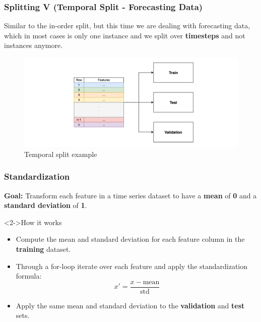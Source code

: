 \documentclass[t,english]{beamer}
\begin{document}
\begin{frame}
  \frametitle{Splitting V (Temporal Split - Forecasting Data)}
  Similar to the in-order split, but this time we are dealing with forecasting data, which in most cases is only one instance and we split over \textbf{timesteps} and not instances anymore.

  \begin{figure}[H]
    \includegraphics[width=1\textwidth]{figures/splitting/temporal_split.png}
    \caption{Temporal split example}
    \label{fig:temporal_split}
  \end{figure}
\end{frame}

\begin{frame}
  \frametitle{Standardization}
  \textbf{Goal:} Transform each feature in a time series dataset to have a \textbf{mean} of \textbf{0} and a \textbf{standard deviation} of \textbf{1}.

  \begin{block}<2->{How it works}
    \begin{itemize}
      \item<2-> Compute the mean and standard deviation for each feature column in the \textbf{training} dataset.
      \item<3-> Through a for-loop iterate over each feature and apply the standardization formula:
            \begin{equation}
              x' = \frac{x - \text{mean}}{\text{std}}
            \end{equation}
      \item<4-> Apply the same mean and standard deviation to the \textbf{validation} and \textbf{test} sets.
    \end{itemize}
  \end{block}
\end{frame}
\end{document}
